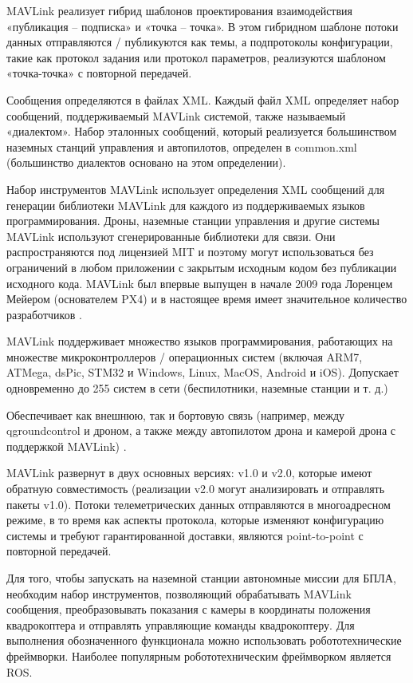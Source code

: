 MAVLink реализует гибрид шаблонов проектирования взаимодействия «публикация -- подписка» и «точка -- точка». В этом гибридном шаблоне потоки данных отправляются / публикуются как темы, а подпротоколы конфигурации, такие как протокол задания или протокол параметров, реализуются шаблоном «точка-точка» с повторной передачей.

Сообщения определяются в файлах XML. Каждый файл XML определяет набор сообщений, поддерживаемый MAVLink системой, также называемый «диалектом». Набор эталонных сообщений, который реализуется большинством наземных станций управления и автопилотов, определен в common.xml (большинство диалектов основано на этом определении).

Набор инструментов MAVLink использует определения XML сообщений для генерации библиотеки MAVLink для каждого из поддерживаемых языков программирования. Дроны, наземные станции управления и другие системы MAVLink используют сгенерированные библиотеки для связи. Они распространяются под лицензией MIT и поэтому могут использоваться без ограничений в любом приложении с закрытым исходным кодом без публикации исходного кода. MAVLink был впервые выпущен в начале 2009 года Лоренцем Мейером (основателем PX4) и в настоящее время имеет значительное количество разработчиков \cite{px}.

MAVLink поддерживает множество языков программирования, работающих на множестве микроконтроллеров / операционных систем (включая ARM7, ATMega, dsPic, STM32 и Windows, Linux, MacOS, Android и iOS). Допускает одновременно до 255 систем в сети (беспилотники, наземные станции и т. д.)

Обеспечивает как внешнюю, так и бортовую связь (например, между q\-ground\-con\-trol и дроном, а также между автопилотом дрона и камерой дрона с поддержкой MAVLink) \cite{mavlink}.

MAVLink развернут в двух основных версиях: v1.0 и v2.0, которые имеют обратную совместимость (реализации v2.0 могут анализировать и отправлять пакеты v1.0). Потоки телеметрических данных отправляются в многоадресном режиме, в то время как аспекты протокола, которые изменяют конфигурацию системы и требуют гарантированной доставки, являются point-to-point с повторной передачей.


Для того, чтобы запускать на наземной станции автономные миссии для БПЛА, необходим набор инструментов, позволяющий обрабатывать MAVLink сообщения, преобразовывать показания с камеры в координаты положения квадрокоптера и отправлять управляющие команды квадрокоптеру. Для выполнения обозначенного функционала можно использовать робототехнические фреймворки. Наиболее популярным робототехническим фреймворком является ROS.
